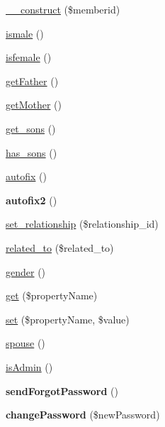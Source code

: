 \begin{DoxyCompactItemize}
\item 
\hyperlink{classmember_aa2427c65795ffbdc72d64e2e91640463}{\-\_\-\-\_\-construct} (\$memberid)
\item 
\hyperlink{classmember_a364bea0f1ea59b67e68293ae5da9f413}{ismale} ()
\item 
\hyperlink{classmember_af93337d3c08cad93fa43b5f30c0215b0}{isfemale} ()
\item 
\hyperlink{classmember_a551821d3d6d64bbf0c6c4c5d62b3366c}{get\-Father} ()
\item 
\hyperlink{classmember_a8c6d2d7c3ad62d4988000e0886d394b2}{get\-Mother} ()
\item 
\hyperlink{classmember_af0d9a69479f2b9c859acb90e97bad85c}{get\-\_\-sons} ()
\item 
\hyperlink{classmember_a024f7356f2279490775b6ae432d51010}{has\-\_\-sons} ()
\item 
\hyperlink{classmember_a45c3ed97d49c45ce716892b4b5e44bd2}{autofix} ()
\item 
\hypertarget{classmember_ae1a0a03869debcb7e7f58eaca72fb2ed}{{\bfseries autofix2} ()}\label{classmember_ae1a0a03869debcb7e7f58eaca72fb2ed}

\item 
\hyperlink{classmember_ae0f93137fb23a9f5ae9e6a287f6232dd}{set\-\_\-relationship} (\$relationship\-\_\-id)
\item 
\hyperlink{classmember_a541afd2c1c096f5810c0b889e33287ba}{related\-\_\-to} (\$related\-\_\-to)
\item 
\hyperlink{classmember_aeb52158abb66bf82955ab17670b11eec}{gender} ()
\item 
\hyperlink{classmember_a7eccf6c8f3bc1bc775502427de8aaf7c}{get} (\$property\-Name)
\item 
\hyperlink{classmember_aa4b22929c0f9688d36c4528b467013d0}{set} (\$property\-Name, \$value)
\item 
\hyperlink{classmember_ac330497056943c44df23963f6a4d1288}{spouse} ()
\item 
\hyperlink{classmember_a2af2011afe5c6ee0404e2f45b93daf11}{is\-Admin} ()
\item 
\hypertarget{classmember_ad691ab2a161f3ad4a5c86435d08e7407}{{\bfseries send\-Forgot\-Password} ()}\label{classmember_ad691ab2a161f3ad4a5c86435d08e7407}

\item 
\hypertarget{classmember_a1e2c7b73375ee37813a78285b170cb79}{{\bfseries change\-Password} (\$new\-Password)}\label{classmember_a1e2c7b73375ee37813a78285b170cb79}

\end{DoxyCompactItemize}
